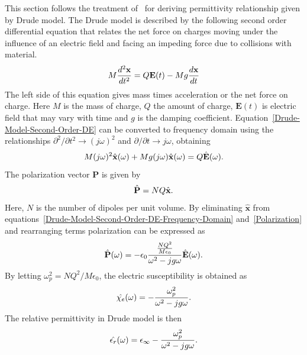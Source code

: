 This section follows the treatment of~\cite[Ch. 10, 289--290]{JBSchneiderUFDTD} for deriving permittivity relationship given by Drude model. The Drude model is described by the following second order differential equation that relates the net force on charges moving under the influence of an electric field and facing an impeding force due to collisions with material.
\begin{equation}
\centering
M\dfrac{d^2 \textbf{x}}{dt^2} = Q \textbf{E}(t) - Mg\dfrac{d \textbf{x}}{dt}
\label{Drude-Model-Second-Order-DE}
\end{equation}
The left side of this equation gives mass times acceleration or the net force on charge. Here $M$ is the mass of charge, $Q$ the amount of charge, $\textbf{E}(t)$ is electric field that may vary with time and $g$ is the damping coefficient. Equation~\ref{Drude-Model-Second-Order-DE} can be converted to frequency domain using the relationships $\partial ^2/\partial t^2 \rightarrow (j\omega)^2$ and $\partial/\partial t \rightarrow j\omega$, obtaining
\begin{equation}
\centering
M(j\omega)^2\hat{\textbf{x}}(\omega)+Mg(j\omega)\hat{\textbf{x}}(\omega)=Q\hat{\textbf{E}}(\omega).
\label{Drude-Model-Second-Order-DE-Frequency-Domain}
\end{equation}
The polarization vector $\textbf{P}$ is given by
\begin{equation}
\centering
\hat{\textbf{P}}=NQ\hat{\textbf{x}}.
\label{Polarization}
\end{equation}
Here, $N$ is the number of dipoles per unit volume. By eliminating $\hat{\textbf{x}}$ from equations~\ref{Drude-Model-Second-Order-DE-Frequency-Domain} and~\ref{Polarization} and rearranging terms polarization can be expressed as
\begin{equation}
\centering
\hat{\textbf{P}}(\omega)=-\epsilon_0\dfrac{\frac{NQ^2}{M\epsilon_0}}{\omega^2-jg\omega}\hat{\textbf{E}}(\omega).
\label{Polarization-Frequency-Domain}
\end{equation}
By letting $\omega^2_p=NQ^2/M\epsilon_0$, the electric susceptibility is obtained as
\begin{equation}
\centering
\hat{\chi_e}(\omega)=-\dfrac{\omega^2_p}{\omega^2-jg\omega}.
\label{Electric-Susceptibility-Drude}
\end{equation}
The relative permittivity in Drude model is then
\begin{equation}
\centering
\hat{\epsilon_r}(\omega)=\epsilon_\infty-\dfrac{\omega^2_p}{\omega^2-jg\omega}.
\label{er-Drude}
\end{equation}
